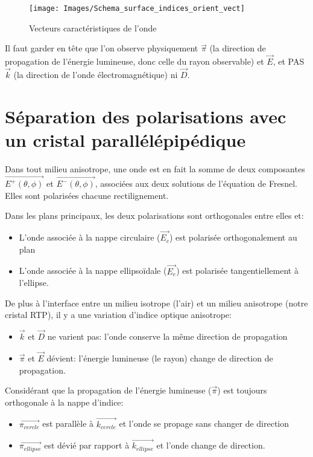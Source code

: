 \documentclass[a4paper,11pt]{report}
\begin{document}
\begin{figure}[h]
    \begin{center}
        \texttt{[image: Images/Schema\_surface\_indices\_orient\_vect]}
        \caption{Vecteurs caractéristiques de l'onde}
        \label{vecteurs}
    \end{center}
\end{figure}


Il faut garder en tête que l'on observe physiquement $\vec{\pi}$ (la direction de propagation de l'énergie lumineuse, donc celle du rayon observable) et $\vec{E}$, et PAS $\vec{k}$ (la direction de l'onde électromagnétique) ni $\vec{D}$.

\section{Séparation des polarisations avec un cristal parallélépipédique}
Dans tout milieu anisotrope, une onde est en fait la somme de deux composantes $\vec{E^+(\theta,\phi)}$ et $\vec{E^-(\theta,\phi)}$, associées aux deux solutions de l'équation de Fresnel. Elles sont polarisées chacune rectilignement.

Dans les plans principaux, les deux polarisations sont orthogonales entre elles et:
\begin{itemize}
    \item L'onde associée à la nappe circulaire ($\vec{E_c}$) est polarisée orthogonalement au plan
    \item L'onde associée à la nappe ellipsoïdale ($\vec{E_e}$) est polarisée tangentiellement à l'ellipse.
\end{itemize}

\newpage
De plus à l'interface entre un milieu isotrope (l'air) et un milieu anisotrope (notre cristal RTP), il y a une variation d'indice optique anisotrope:
\begin{itemize}
    \item $\vec{k}$ et $\vec{D}$ ne varient pas: l'onde conserve la même direction de propagation
    \item $\vec{\pi}$ et $\vec{E}$ dévient: l'énergie lumineuse (le rayon) change de direction de propagation.\newline
\end{itemize}

Considérant que la propagation de l'énergie lumineuse ($\vec{\pi}$) est toujours orthogonale à la nappe d'indice:
\begin{itemize}
    \item $\vec{\pi_{cercle}}$ est parallèle à $\vec{k_{cercle}}$ et l'onde se propage sans changer de direction
    \item $\vec{\pi_{ellipse}}$ est dévié par rapport à $\vec{k_{ellipse}}$ et l'onde change de direction.
\end{itemize}
\end{document}
